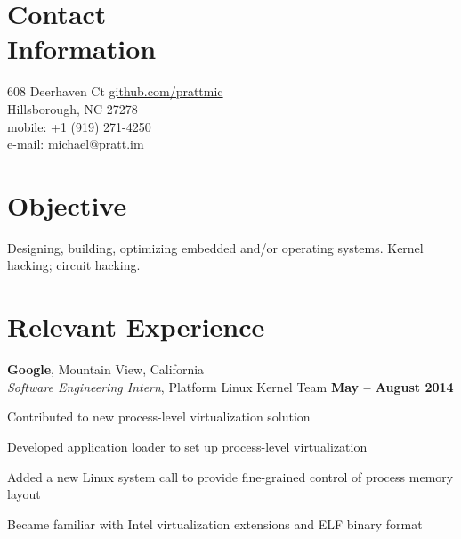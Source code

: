 \documentclass[margin,line,letterpaper]{resume}
\begin{document}
\begin{resume}

    \section{\mysidestyle Contact\\Information}

    608 Deerhaven Ct                \hfill {\Large\href{http://github.com/prattmic}{github.com/prattmic}}   \\
    Hillsborough, NC 27278          \\
    mobile: +1 (919) 271-4250       \\
    e-mail: michael@pratt.im        \vspace{0mm}\\\vspace{-4.5mm}%


    \section{\mysidestyle Objective}

    Designing, building, optimizing embedded and/or operating systems.  Kernel hacking; circuit hacking.


    \section{\mysidestyle Relevant Experience}

    \textbf{Google}, Mountain View, California \vspace{1mm}\\\vspace{1mm}%
    \textsl{Software Engineering Intern}, Platform Linux Kernel Team \hfill \textbf{May -- August 2014}\vspace{-3mm}\\\vspace{-1mm}%
    \begin{list2}
    \item Contributed to new process-level virtualization solution
    \item Developed application loader to set up process-level virtualization
    \item Added a new Linux system call to provide fine-grained control of process memory layout
    \item Became familiar with Intel virtualization extensions and ELF binary format
    \end{list2}


\end{resume}
\end{document}
